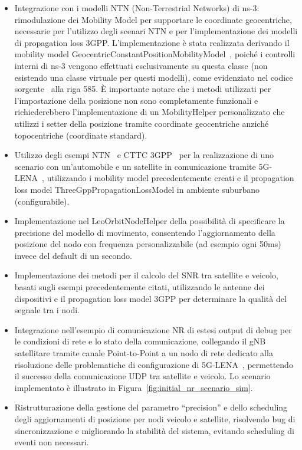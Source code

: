 \documentclass[12pt,a4paper]{article}
\providecommand{\tightlist}{%
  \setlength{\itemsep}{0pt}\setlength{\parskip}{0pt}}
\begin{document}
\begin{itemize}
\tightlist
\item
  Integrazione con i modelli NTN (Non-Terrestrial Networks) di ns-3: rimodulazione dei Mobility Model per supportare le coordinate geocentriche, necessarie per l'utilizzo degli scenari NTN e per l'implementazione dei modelli di propagation loss 3GPP. L'implementazione è stata realizzata derivando il mobility model GeocentricConstantPositionMobilityModel~\cite{ns3_ntn_workshop}, poiché i controlli interni di ns-3 vengono effettuati esclusivamente su questa classe (non esistendo una classe virtuale per questi modelli), come evidenziato nel codice sorgente~\cite{ns3_channel_condition} alla riga 585. È importante notare che i metodi utilizzati per l'impostazione della posizione non sono completamente funzionali e richiederebbero l'implementazione di un MobilityHelper personalizzato che utilizzi i setter della posizione tramite coordinate geocentriche anziché topocentriche (coordinate standard).
\item
  Utilizzo degli esempi NTN~\cite{ns3_ntn_example} e CTTC 3GPP~\cite{cttc_3gpp_example} per la realizzazione di uno scenario con un'automobile e un satellite in comunicazione tramite 5G-LENA~\cite{5glena}, utilizzando i mobility model precedentemente creati e il propagation loss model ThreeGppPropagationLossModel in ambiente suburbano (configurabile).
\item
  Implementazione nel LeoOrbitNodeHelper della possibilità di specificare la precisione del modello di movimento, consentendo l'aggiornamento della posizione del nodo con frequenza personalizzabile (ad esempio ogni 50ms) invece del default di un secondo.
\item
  Implementazione dei metodi per il calcolo del SNR tra satellite e veicolo, basati sugli esempi precedentemente citati, utilizzando le antenne dei dispositivi e il propagation loss model 3GPP per determinare la qualità del segnale tra i nodi.
\item
  Integrazione nell'esempio di comunicazione NR di estesi output di debug per le condizioni di rete e lo stato della comunicazione, collegando il gNB satellitare tramite canale Point-to-Point a un nodo di rete dedicato alla risoluzione delle problematiche di configurazione di 5G-LENA~\cite{5glena}, permettendo il successo della comunicazione UDP tra satellite e veicolo. Lo scenario implementato è illustrato in Figura~\ref{fig:initial_nr_scenario_sim}.
\item
  Ristrutturazione della gestione del parametro ``precision'' e dello scheduling degli aggiornamenti di posizione per nodi veicolo e satellite, risolvendo bug di sincronizzazione e migliorando la stabilità del sistema, evitando scheduling di eventi non necessari.
\end{itemize}
\end{document}

